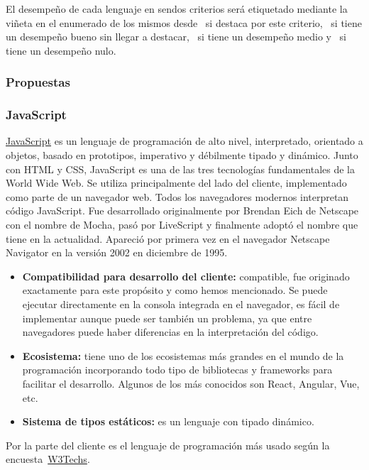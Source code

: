 El desempeño de cada lenguaje en sendos criterios será etiquetado mediante la viñeta en el enumerado de los mismos desde \esp~si destaca por este criterio, \bien~si tiene un desempeño bueno sin llegar a destacar, \regular~si tiene un desempeño medio y \mal~si tiene un desempeño nulo.

\subsubsection{Propuestas}

\subsubsection{JavaScript}

\href{https://es.wikipedia.org/w/index.php?title=JavaScript&oldid=161023746}{JavaScript} es un lenguaje de programación de alto nivel, interpretado, orientado a objetos, basado en prototipos, imperativo y débilmente tipado y dinámico. Junto con HTML y CSS, JavaScript es una de las tres tecnologías fundamentales de la World Wide Web. Se utiliza principalmente del lado del cliente, implementado como parte de un navegador web. Todos los navegadores modernos interpretan código JavaScript. Fue desarrollado originalmente por Brendan Eich de Netscape con el nombre de Mocha, pasó por LiveScript y finalmente adoptó el nombre que tiene en la actualidad. Apareció por primera vez en el navegador Netscape Navigator en la versión 2002 en diciembre de 1995.

\begin{itemize}
    \item[\esp] \textbf{Compatibilidad para desarrollo del cliente:} compatible, fue originado exactamente para este propósito y como hemos mencionado. Se puede ejecutar directamente en la consola integrada en el navegador, es fácil de implementar aunque puede ser también un problema, ya que entre navegadores puede haber diferencias en la interpretación del código.
    \item[\esp] \textbf{Ecosistema:} tiene uno de los ecosistemas más grandes en el mundo de la programación incorporando todo tipo de bibliotecas y frameworks para facilitar el desarrollo. Algunos de los más conocidos son React, Angular, Vue, etc.
    \item[\mal] \textbf{Sistema de tipos estáticos:} es un lenguaje con tipado dinámico.
\end{itemize}

Por la parte del cliente es el lenguaje de programación más usado según la encuesta~\href{https://w3techs.com/technologies/overview/client_side_language}{W3Techs}.


